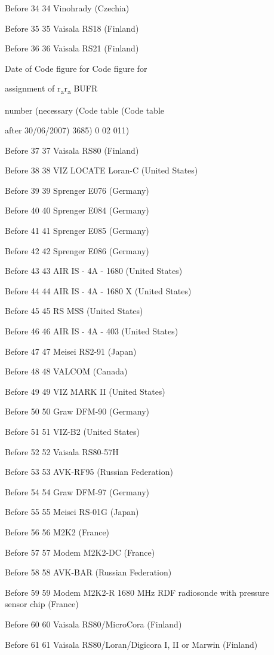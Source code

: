 Before 34 34 Vinohrady (Czechia)

Before 35 35 Vaisala RS18 (Finland)

Before 36 36 Vaisala RS21 (Finland)

Date of Code figure for Code figure for

assignment of r\textsubscript{a}r\textsubscript{a} BUFR

number (necessary (Code table (Code table

after 30/06/2007) 3685) 0 02 011)

Before 37 37 Vaisala RS80 (Finland)

Before 38 38 VIZ LOCATE Loran-C (United States)

Before 39 39 Sprenger E076 (Germany)

Before 40 40 Sprenger E084 (Germany)

Before 41 41 Sprenger E085 (Germany)

Before 42 42 Sprenger E086 (Germany)

Before 43 43 AIR IS - 4A - 1680 (United States)

Before 44 44 AIR IS - 4A - 1680 X (United States)

Before 45 45 RS MSS (United States)

Before 46 46 AIR IS - 4A - 403 (United States)

Before 47 47 Meisei RS2-91 (Japan)

Before 48 48 VALCOM (Canada)

Before 49 49 VIZ MARK II (United States)

Before 50 50 Graw DFM-90 (Germany)

Before 51 51 VIZ-B2 (United States)

Before 52 52 Vaisala RS80-57H

Before 53 53 AVK-RF95 (Russian Federation)

Before 54 54 Graw DFM-97 (Germany)

Before 55 55 Meisei RS-01G (Japan)

Before 56 56 M2K2 (France)

Before 57 57 Modem M2K2-DC (France)

Before 58 58 AVK-BAR (Russian Federation)

Before 59 59 Modem M2K2-R 1680 MHz RDF radiosonde with pressure\\
sensor chip (France)

Before 60 60 Vaisala RS80/MicroCora (Finland)

Before 61 61 Vaisala RS80/Loran/Digicora I, II or Marwin (Finland)


